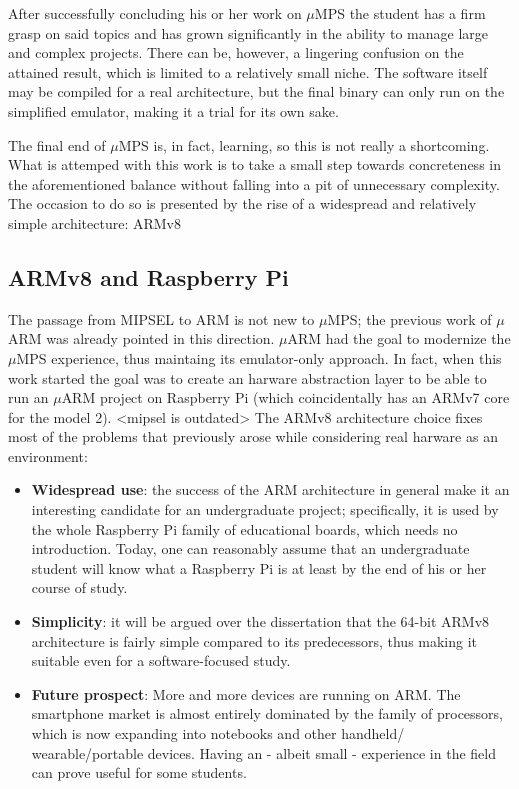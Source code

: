 \documentclass[12pt,a4paper,openright,twoside]{report}
\begin{document}
After successfully concluding his or her work on $\mu$MPS the student has
a firm grasp on said topics and has grown significantly in the ability to
manage large and complex projects. There can be, however, a lingering confusion
on the attained result, which is limited to a relatively small niche.
The software itself may be compiled for a real architecture, but the final binary
can only run on the simplified emulator, making it a trial for its own sake.

The final end of $\mu$MPS is, in fact, learning, so this is not really a shortcoming.
What is attemped with this work is to take a small step towards concreteness in 
the aforementioned balance without falling into a pit of unnecessary complexity.
The occasion to do so is presented by the rise of a widespread and relatively
simple architecture: ARMv8

\subsection{ARMv8 and Raspberry Pi}
The passage from MIPSEL to ARM is not new to $\mu$MPS; the previous work
of $\mu$ARM was already pointed in this direction. $\mu$ARM had the goal to
modernize the $\mu$MPS experience, thus maintaing its emulator-only approach.
In fact, when this work started the goal was to create an harware abstraction
layer to be able to run an $\mu$ARM project on Raspberry Pi (which 
coincidentally has an ARMv7 core for the model 2).
<mipsel is outdated>
The ARMv8 architecture choice fixes most of the problems that previously arose while
considering real harware as an environment:
\begin{itemize}
    \item \textbf{Widespread use}: the success of the ARM architecture in general
            make it an interesting candidate for an undergraduate project; specifically,
            it is used by the whole Raspberry Pi family of educational boards, which
            needs no introduction. Today, one can reasonably assume that an undergraduate
            student will know what a Raspberry Pi is at least by the end of his or her
            course of study.
    \item \textbf{Simplicity}: it will be argued over the dissertation that the
            64-bit ARMv8 architecture is fairly simple compared to its predecessors,
            thus making it suitable even for a software-focused study.
    \item \textbf{Future prospect}: More and more devices are running on ARM.
            The smartphone market is almost entirely dominated by the family of
            processors, which is now expanding into notebooks and other handheld/
            wearable/portable devices.
            Having an - albeit small - experience in the field can prove useful
            for some students.
\end{itemize}
\end{document}
